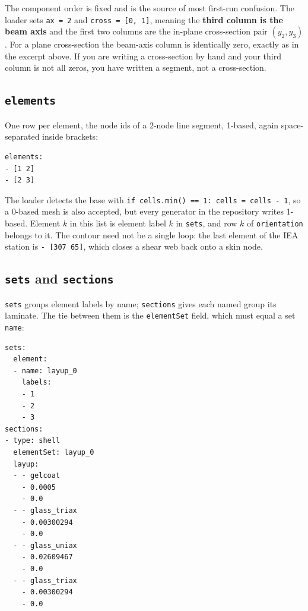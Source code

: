 The component order is fixed and is the source of most first-run confusion. The
loader sets \texttt{ax = 2} and \texttt{cross = [0, 1]}, meaning the
\textbf{third column is the beam axis} and the first two columns are the
in-plane cross-section pair $(y_2, y_3)$. For a plane cross-section the beam-axis
column is identically zero, exactly as in the excerpt above. If you are writing a
cross-section by hand and your third column is not all zeros, you have written a
segment, not a cross-section.

\subsection{\texttt{elements}}

One row per element, the node ids of a 2-node line segment, 1-based, again
space-separated inside brackets:

\begin{lstlisting}[style=shellst,caption={The first two element rows; element k here is element label k everywhere else in the file.}]
elements:
- [1 2]
- [2 3]
\end{lstlisting}

The loader detects the base with \texttt{if cells.min() == 1: cells = cells - 1},
so a 0-based mesh is also accepted, but every generator in the repository writes
1-based. Element $k$ in this list is element label $k$ in \texttt{sets}, and
row $k$ of \texttt{orientation} belongs to it. The contour need not be a
single loop: the last element of the IEA station is \texttt{- [307 65]}, which
closes a shear web back onto a skin node.

\subsection{\texttt{sets} and \texttt{sections}}

\texttt{sets} groups element labels by name; \texttt{sections} gives each named
group its laminate. The tie between them is the \texttt{elementSet} field, which
must equal a set \texttt{name}:

\begin{lstlisting}[style=shellst,caption={Abridged sets and sections blocks. In the real file layup\_0 lists 25 labels (elements 1-12 and 209-221) and there are six sets and six sections.}]
sets:
  element:
  - name: layup_0
    labels:
    - 1
    - 2
    - 3
sections:
- type: shell
  elementSet: layup_0
  layup:
  - - gelcoat
    - 0.0005
    - 0.0
  - - glass_triax
    - 0.00300294
    - 0.0
  - - glass_uniax
    - 0.02609467
    - 0.0
  - - glass_triax
    - 0.00300294
    - 0.0
\end{lstlisting}

